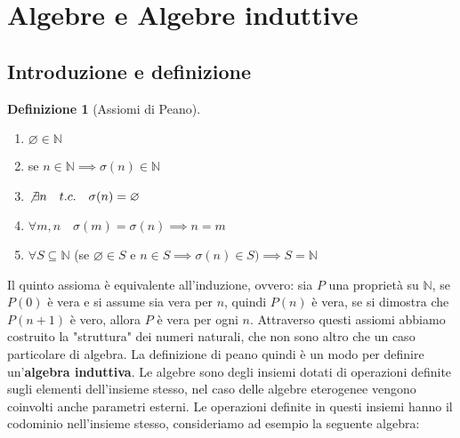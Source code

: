 \documentclass{article}
\theoremstyle{definition}
\theoremstyle{definition}
\theoremstyle{definition}
\newtheorem{definition}[theorem]{Definizione}
\theoremstyle{remark}
\begin{document}
\tableofcontents
\newpage
\section{Algebre e Algebre induttive}
\subsection{Introduzione e definizione}
\begin{definition}[Assiomi di Peano]
    \leavevmode\newline
    \begin{enumerate}
        \renewcommand{\labelenumi}{\Roman{enumi}.}
        \item $\varnothing  \in \mathbb{N}$
        \item  se $n\in\mathbb{N}\implies \sigma(n)\in\mathbb{N}$
        \item $\not\exists n\quad t.c.\quad \sigma(n)= \varnothing$
        \item $\forall m,n \quad \sigma(m)=\sigma(n)\implies n = m$
        \item $\forall S\subseteq \mathbb{N}$ (se $\varnothing \in S$ e $n\in S \implies \sigma(n)\in S)\implies S=\mathbb{N}$
    \end{enumerate}
\end{definition}
Il quinto assioma è equivalente all'induzione, ovvero: sia $P$ una proprietà su $\mathbb{N}$, se $P(0)$ è vera  e si assume sia vera per $n$, quindi
$P(n)$ è vera, se si dimostra che $P(n+1)$ è vero, allora $P$ è vera per ogni $n$. Attraverso questi assiomi abbiamo costruito la "struttura" dei numeri naturali, che non sono altro
che un caso particolare di algebra.
La definizione di peano quindi è un modo per definire un'\textbf{algebra induttiva}. Le algebre sono degli insiemi dotati di operazioni
definite sugli elementi dell'insieme stesso, nel caso delle algebre eterogenee vengono coinvolti anche parametri esterni. Le operazioni definite in questi insiemi
hanno il codominio nell'insieme stesso, consideriamo ad esempio la seguente algebra:
\end{document}
